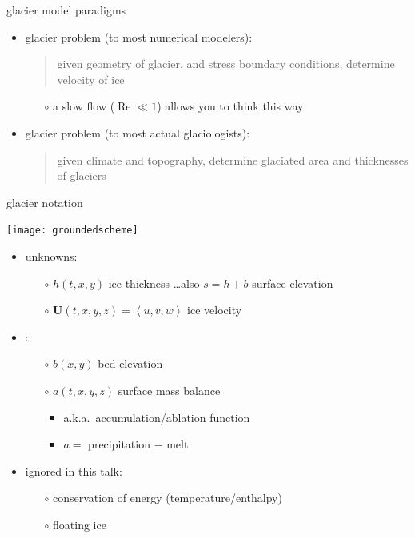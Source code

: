 \documentclass[xcolor={dvipsnames}]{beamer}
\newcommand\bU{\mathbf{U}}
\begin{document}
\begin{frame}{glacier model paradigms}

\begin{itemize}
\item<1> glacier problem \alert<1>{(to most numerical modelers)}:
   \begin{quote}
   given geometry of glacier, and stress boundary conditions, determine velocity of ice
   \end{quote}
\vspace{-4mm}
  \begin{itemize}
  \item[$\circ$] a slow flow ($\operatorname{Re} \ll 1$) allows you to think this way
  \end{itemize}

\bigskip
\item<2> glacier problem \alert<2>{(to most actual glaciologists)}:
   \begin{quote}
   given climate and topography, determine glaciated area and thicknesses of glaciers
   \end{quote}
\end{itemize}
\end{frame}


\begin{frame}{glacier notation}

\begin{center}
\texttt{[image: groundedscheme]}
\end{center}

\begin{itemize}
\item unknowns:
  \begin{itemize}
  \item[$\circ$]  $h(t,x,y)$ ice thickness \hfill \dots also $s=h+b$ surface elevation
  \item[$\circ$]  $\bU(t,x,y,z) = \left<u,v,w\right>$ ice velocity
  \end{itemize}
\item {}:
  \begin{itemize}
  \item[$\circ$]  $b(x,y)$ bed elevation 
  \item[$\circ$]  $a(t,x,y,z)$ surface mass balance  
    \begin{itemize}
    \item a.k.a.~accumulation/ablation function
    \item $a=$ precipitation $-$ melt
    \end{itemize}
  \end{itemize}
\item ignored in this talk:
  \begin{itemize}
  \item[$\circ$]  conservation of energy (temperature/enthalpy)
  \item[$\circ$]  floating ice
  \end{itemize}
\end{itemize}
\end{frame}
\end{document}
